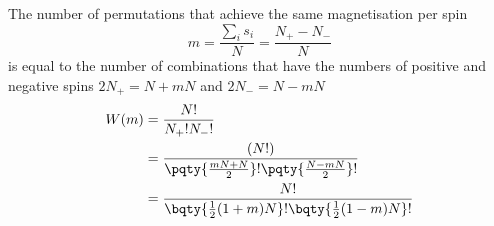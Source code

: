 \documentclass[12pt]{article}
\begin{document}
        \subsubsection{} The number of permutations that achieve the same magnetisation per spin \[
            m = \frac{\sum_i s_i}{N} = \frac{N_+ - N_ -}{N}
        \]
        is equal to the number of combinations that have the numbers of positive and negative spins \(2N_ + = N + mN\) and \(2N_ -= N - mN\)
        \begin{align*}
            W (m) &= \frac{N!}{N_+!N_ -!}\\
            &= \frac{(N!)}{\pqty{\frac{mN + N}{2}}! \pqty{\frac{N - mN}{2}}! }\\
            &= \frac{N!}{\bqty{\frac{1}{2}(1 + m)N}! \bqty{\frac{1}{2}(1 - m)N}! }
        \end{align*}
\end{document}
